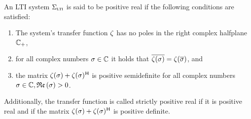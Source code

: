 \begin{definition}
    An \ac{LTI} system $\Sigma_{\textnormal{\scshape lti}}$ is said to be positive real if the following conditions are satisfied:
    \begin{enumerate}
        \item The system's transfer function $\zeta$ has no poles in the right complex halfplane $\mathbb{C}_+$,
        \item for all complex numbers $\sigma \in \mathbb{C}$ it holds that $\overline{\zeta(\sigma)} = \zeta(\overline{\sigma})$, and
        \item the matrix $\zeta(\sigma) + \zeta(\sigma)^{\mkern1mu \mathsf{H}}$ is positive semidefinite for all complex numbers $\sigma \in \mathbb{C}, \mathop{}\!\mathfrak{Re}\left(\sigma\right) > 0$.
    \end{enumerate}
    Additionally, the transfer function is called strictly positive real if it is positive real and if the matrix $\zeta(\sigma) + \zeta(\sigma)^{\mkern1mu \mathsf{H}}$ is positive definite.
\end{definition}

